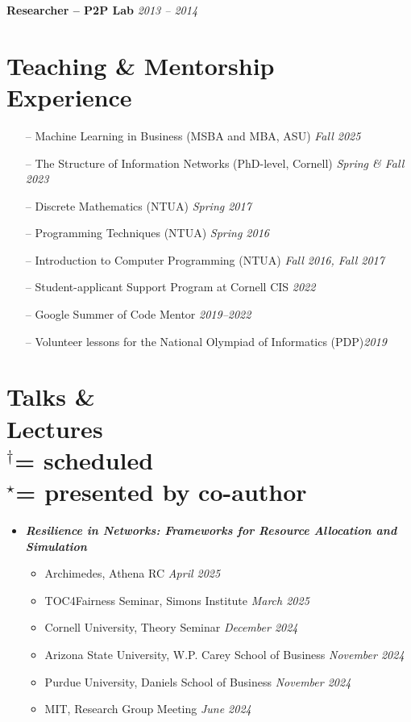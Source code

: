 \documentclass[margin]{res}
\newcommand{\field}[2]{\noindent \textbf{#1} \hfill #2 \\}
\newcommand{\scheduled}[0]{\ensuremath {^\dagger}}
\newcommand{\presentedbycoauthor}[0]{\ensuremath {^{\star}}}
\newcommand{\bemph}[1]{\textbf{\emph{#1}}}
\begin{document}
\begin{resume}
\field{Researcher -- P2P Lab}{\emph{2013 -- 2014}}{}



\section{Teaching \& Mentorship \\ Experience} 
\begin{itemize}[nosep]
	\item[--] Machine Learning in Business (MSBA and MBA, ASU) \hfill \emph{Fall 2025}
	
	\item[--] The Structure of Information Networks (PhD-level, Cornell) \hfill \emph{Spring \& Fall 2023} 
    \item[--] Discrete Mathematics (NTUA) \hfill \emph{Spring 2017}
    \item[--] Programming Techniques (NTUA) \hfill \emph{Spring 2016}
    \item[--] Introduction to Computer Programming (NTUA) \hfill \emph{Fall 2016, Fall 2017}
\end{itemize}

\medskip

\begin{itemize}[nosep]
	\item[--] Student-applicant Support Program at Cornell CIS \hfill \emph{2022}
	\item[--] Google Summer of Code Mentor \hfill \emph{2019--2022}
	\item[--] Volunteer lessons for the National Olympiad of Informatics (PDP)\hfill \emph{2019}
\end{itemize}


\section{Talks \& \\ Lectures \\
\footnotesize
\scheduled  = \textup{scheduled} \\ \presentedbycoauthor = \textup{presented by co-author}
}

\begin{itemize}[nosep]
	\item \bemph{Resilience in Networks: Frameworks for Resource Allocation and Simulation}
	\begin{itemize}[nosep]
		\item Archimedes, Athena RC \hfill \emph{April 2025}
		\item TOC4Fairness Seminar, Simons Institute \hfill \emph{March 2025}
		\item Cornell University, Theory Seminar \hfill \emph{December 2024}
		\item Arizona State University, W.P. Carey School of Business \hfill \emph{November 2024}
		\item Purdue University, Daniels School of Business \hfill \emph{November 2024}
		\item MIT, Research Group Meeting \hfill \emph{June 2024}
	\end{itemize}


\end{itemize}
\end{resume}
\end{document}
